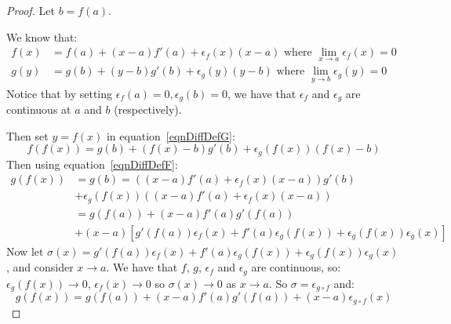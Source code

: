 \documentclass[../Main.tex]{subfiles}
\begin{document}
\begin{proof}
    Let $b = f(a)$.\par
    We know that:
    \begin{align}
        f(x) &= f(a) + (x-a) f'(a) + \epsilon_f(x) (x - a) \text{ where } \lim_{x \to a} \epsilon_f(x) = 0 \label{eqnDiffDefF} \\
        g(y) &= g(b) + (y-b) g'(b) + \epsilon_g(y) (y - b) \text{ where } \lim_{y \to b} \epsilon_g(y) = 0 \label{eqnDiffDefG}
    \end{align}
    Notice that by setting $\epsilon_f(a) = 0, \epsilon_g(b) = 0$, we have that $\epsilon_f$ and $\epsilon_g$ are continuous at $a$ and $b$ (respectively).\par
    Then set $y = f(x)$ in equation~\ref{eqnDiffDefG}:
    \begin{equation*}
        f(f(x)) = g(b) + (f(x) - b) g'(b) + \epsilon_g(f(x))(f(x) - b)
    \end{equation*}
    Then using equation~\ref{eqnDiffDefF}:
    \begin{align*}
        g(f(x)) &= g(b) = \left((x - a) f'(a) + \epsilon_f(x)(x - a)\right) g'(b) \\
        &+ \epsilon_g(f(x))\left((x - a) f'(a) + \epsilon_f(x) (x - a)\right) \\
        &= g(f(a)) + (x - a)f'(a) g'(f(a)) \\
        &+ (x - a) \left[g'(f(a)) \epsilon_f(x) + f'(a) \epsilon_g(f(x)) + \epsilon_g(f(x)) \epsilon_g(x)\right]
    \end{align*}
    Now let $\sigma(x) = g'(f(a)) \epsilon_f(x) + f'(a) \epsilon_g(f(x)) + \epsilon_g(f(x)) \epsilon_g(x)$, and consider $x \to a$. We have that $f$, $g$, $\epsilon_f$ and $\epsilon_g$ are continuous, so:
    $\epsilon_g(f(x)) \to 0$, $\epsilon_f(x) \to 0$ so $\sigma(x) \to 0$ as $x \to a$. So $\sigma = \epsilon_{g \circ f}$ and:
    \begin{equation*}
        g(f(x)) = g(f(a)) + (x - a) f'(a) g'(f(a)) + (x - a) \epsilon_{g \circ f}(x)
    \end{equation*}
\end{proof}
\end{document}
